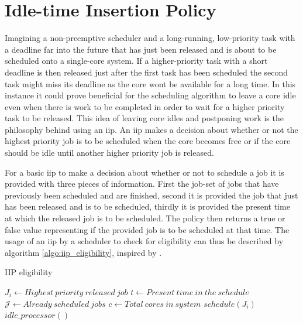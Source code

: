 \documentclass{kththesis}
\begin{document}
\section{Idle-time Insertion Policy} \label{sec:iip}


Imagining a non-preemptive scheduler and a long-running, low-priority task with a deadline far into
the future that has just been released and is about to be scheduled onto a single-core system. If a
higher-priority task with a short deadline is then released just after the first task has been
scheduled the second task might miss its deadline as the core wont be available for a long time. In
this instance it could prove beneficial for the scheduling algorithm to leave a core idle even when
there is work to be completed in order to wait for a higher priority task to be released. This idea of
leaving core idles and postponing work is the philosophy behind using an \acrshort{iip}. An
\acrshort{iip} makes a decision about whether or not the highest priority job is to be scheduled
when the core becomes free or if the core should be idle until another higher priority job is
released.

For a basic \acrshort{iip} to make a decision about whether or not to schedule a job it is provided
with three pieces of information. First the job-set of jobs that have previously been scheduled and
are finished, second it is provided the job that just has been released and is to be scheduled,
thirdly it is provided the present time at which the released job is to be scheduled. The policy
then returns a true or false value representing if the provided job is to be scheduled at that time. The
usage of an \acrshort{iip} by a scheduler to check for eligibility can thus be described by
algorithm \ref{algo:iip_eligibility}, inspired by \parencite{nasri_exact_2017}.

\begin{algorithm}
    \caption{IIP eligibility}
    \label{algo:iip_eligibility}
    \begin{algorithmic}[1]
        \State $J_i\gets Highest\ priority\ released\ job$
        \State $t\gets Present\ time\ in\ the\ schedule$
        \State $\mathcal{J}\gets Already\ scheduled\ jobs$
        \State $c\gets Total\ cores\ in\ system$
            \State $schedule(J_i)$
        \Else
            \State $idle\_processor()$
        \EndIf
    \end{algorithmic}
\end{algorithm}
\end{document}
